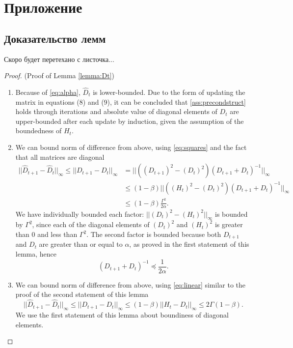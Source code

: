 \appendix
\section{Приложение}

\subsection{Доказательство лемм}
Скоро будет перетехано с листочка...
\label{appendix:lemmas}

\begin{proof} (Proof of Lemma \ref{lemma:Dt})
\begin{enumerate}
    \item Because of \eqref{eq:alpha}, $\hat{D}_t$ is lower-bounded. Due to the form of updating the matrix in equations (8) and (9), it can be concluded that \ref{ass:precondstruct} holds through iterations and absolute value of diagonal elements of $D_t$ are upper-bounded after each update by induction, given the assumption of the boundedness of $H_t$.
    \item We can bound norm of difference from above, using \eqref{eq:squares} and the fact that all matrices are diagonal
    \begin{equation*}
    \begin{aligned}
    || \hat{D}_{t+1} - \hat{D}_t||_\infty \le || D_{t+1} - D_t||_\infty &=  || ((D_{t+1})^2 - (D_t)^2)(D_{t+1} + D_t)^{-1} ||_\infty \\
    &\le (1 - \beta)|| ((H_t)^2 - (D_t)^2)(D_{t+1} + D_t)^{-1} ||_\infty \\
    &\le (1 - \beta)\frac{\Gamma^2}{2\alpha}.
    \end{aligned}
    \end{equation*}
    We have individually bounded each factor: $||(D_t)^2 - (H_t)^2||_\infty$ is bounded by $\Gamma^2$, since each of the diagonal elements of $(D_t)^2$ and $(H_t)^2$ is greater than 0 and less than $\Gamma^2$.
    The second factor is bounded because both $D_{t+1}$ and $D_t$ are greater than or equal to $\alpha$, as proved in the first statement of this lemma, hence $$(D_{t+1} + D_t)^{-1} \preccurlyeq \frac{1}{2\alpha}.$$

    \item We can bound norm of difference from above, using \eqref{eq:linear} similar to the proof of the second statement of this lemma
    \begin{equation*}
    || \hat{D}_{t+1} - \hat{D}_t||_\infty \le || D_{t+1} - D_t||_\infty \le (1 - \beta)|| H_t - D_t ||_\infty \le 2\Gamma (1 - \beta).
    \end{equation*}
    We use the first statement of this lemma about boundiness of diagonal elements.
\end{enumerate}


\end{proof}

